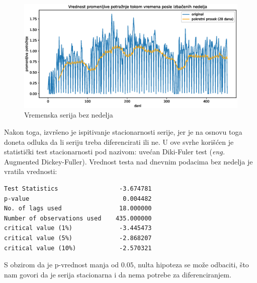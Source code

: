 \documentclass[12pt,oneside]{memoir}
\begin{document}
\begin{figure}[!ht]
  \centering
  \includegraphics[width=1\textwidth]{./grafici/vremenska_serija_primer_bez_nedelja.eps}
  \caption{Vremenska serija bez nedelja}
  \label{fig: dnevna_vremenska_serija_bez_nedelja}
\end{figure}
Nakon toga, izvršeno je ispitivanje stacionarnosti serije, jer je na osnovu toga doneta odluka da li seriju treba diferencirati ili ne. U ove svrhe korišćen je statistički test stacionarnosti pod nazivom: uvećan Diki-Fuler test (\textit{eng.} Augmented Dickey-Fuller). Vrednost testa nad dnevnim podacima bez nedelja je vratila vrednosti:
\begin{minipage}{\linewidth}
\begin{verbatim}
Test Statistics                 -3.674781
p-value                          0.004482
No. of lags used                18.000000
Number of observations used    435.000000
critical value (1%)             -3.445473
critical value (5%)             -2.868207
critical value (10%)            -2.570321
\end{verbatim}
\vspace{10pt}
\end{minipage}
S obzirom da je p-vrednost manja od $0.05$, nulta hipoteza se može odbaciti, što nam govori da je serija stacionarna i da nema potrebe za diferenciranjem.
\end{document}
